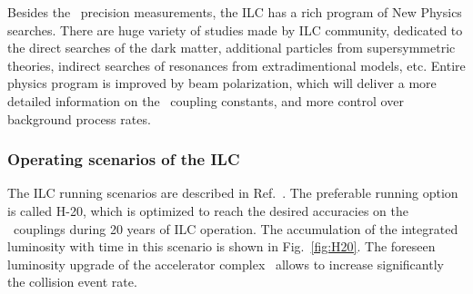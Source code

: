 


 


Besides the \sm\ precision measurements, the ILC has a rich program of New Physics searches. 
There are huge variety of studies made by ILC community, dedicated to the direct searches of the dark matter, additional particles from supersymmetric theories, indirect searches of resonances from extradimentional models, etc.
Entire physics program is improved  by beam polarization, which will deliver a more detailed information on the \sm\ coupling constants, and more control over background process rates. 
\subsubsection{Operating scenarios of the ILC}
\label{sec:ILCOperation}
The ILC running scenarios are described in Ref.~\cite{bib:H20}. 
The preferable running option is called H-20, which is optimized to reach the desired accuracies on the \sm\ couplings during 20 years of ILC operation. 
The accumulation of the integrated luminosity with time in this scenario is shown in Fig.~\ref{fig:H20}.
The foreseen luminosity upgrade of the accelerator complex~\cite{bib:LumiUp} allows to  increase significantly the collision event rate. 

